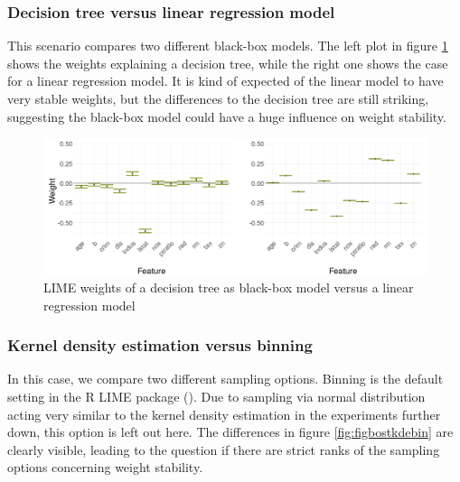 \documentclass[]{krantz}
\begin{document}
\subsubsection{Decision tree versus linear regression
model}\label{decision-tree-versus-linear-regression-model}

This scenario compares two different black-box models. The left plot in
figure \ref{fig:figbosttreelm} shows the weights explaining a decision
tree, while the right one shows the case for a linear regression model.
It is kind of expected of the linear model to have very stable weights,
but the differences to the decision tree are still striking, suggesting
the black-box model could have a huge influence on weight stability.

\begin{figure}

{\centering \includegraphics[width=0.99\linewidth]{images/boston_treeVSlm} 

}

\caption{LIME weights of a decision tree as black-box model versus a linear regression model}\label{fig:figbosttreelm}
\end{figure}

\subsubsection{Kernel density estimation versus
binning}\label{kernel-density-estimation-versus-binning}

In this case, we compare two different sampling options. Binning is the
default setting in the R LIME package (\citet{thomasp85lime}). Due to
sampling via normal distribution acting very similar to the kernel
density estimation in the experiments further down, this option is left
out here. The differences in figure \ref{fig:figbostkdebin} are clearly
visible, leading to the question if there are strict ranks of the
sampling options concerning weight stability.
\end{document}
